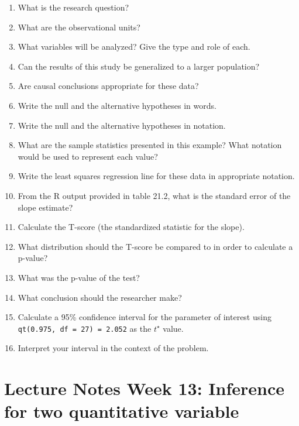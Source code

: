 \documentclass[
]{report}
\newcommand{\rgs}{\vspace{12pt}} %
\begin{document}
\begin{enumerate}
\def\labelenumi{\arabic{enumi}.}
\item
  What is the research question?
  \rgs
\item
  What are the observational units?
  \rgs
\item
  What variables will be analyzed? Give the type and role of each.
  \rgs
  \rgs
\item
  Can the results of this study be generalized to a larger population?
  \rgs
\item
  Are causal conclusions appropriate for these data?
  \rgs
\item
  Write the null and the alternative hypotheses in words.
  \rgs
  \rgs
\item
  Write the null and the alternative hypotheses in notation.
  \rgs
\item
  What are the sample statistics presented in this example? What notation would be used to represent each value?
  \rgs
\item
  Write the least squares regression line for these data in appropriate notation.
  \rgs
\item
  From the R output provided in table 21.2, what is the standard error of the slope estimate?
  \rgs
\item
  Calculate the T-score (the standardized statistic for the slope).
  \rgs
  \rgs
\item
  What distribution should the T-score be compared to in order to calculate a p-value?
  \rgs
\item
  What was the p-value of the test?
  \rgs
\item
  What conclusion should the researcher make?
  \rgs
  \rgs
\item
  Calculate a 95\% confidence interval for the parameter of interest using \texttt{qt(0.975,\ df\ =\ 27)\ =\ 2.052} as the \(t^\star\) value.
  \rgs
  \rgs
\item
  Interpret your interval in the context of the problem.
  \rgs
  \rgs
\end{enumerate}

\newpage

\hypertarget{lecture-notes-week-13-inference-for-two-quantitative-variable}{%
\section{Lecture Notes Week 13: Inference for two quantitative variable}\label{lecture-notes-week-13-inference-for-two-quantitative-variable}}
\end{document}
